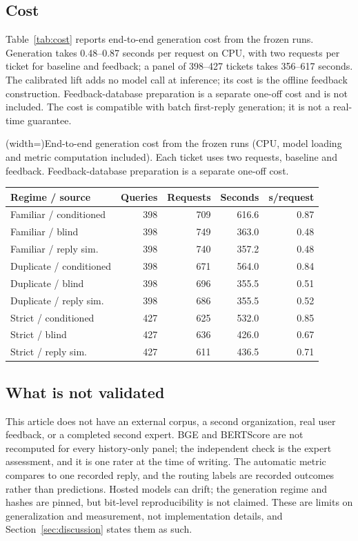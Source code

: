\subsection{Cost}
Table~\ref{tab:cost} reports end-to-end generation cost from the frozen runs.
Generation takes 0.48--0.87 seconds per request on CPU, with two requests per ticket
for baseline and feedback; a panel of 398--427 tickets takes 356--617 seconds. The
calibrated lift adds no model call at inference; its cost is the offline feedback
construction. Feedback-database preparation is a separate one-off cost and is not
included. The cost is compatible with batch first-reply generation; it is not a
real-time guarantee.

\Table[!btp](width=\textwidth){End-to-end generation cost from the frozen runs
(CPU, model loading and metric computation included). Each ticket uses two
requests, baseline and feedback. Feedback-database preparation is a separate
one-off cost.\label{tab:cost}}{
\begin{tabular}{@{}lrrrr@{}}
\toprule
Regime / source & Queries & Requests & Seconds & s/request \\
\midrule
Familiar / conditioned    & 398 & 709 & 616.6 & 0.87 \\
Familiar / blind          & 398 & 749 & 363.0 & 0.48 \\
Familiar / reply sim.     & 398 & 740 & 357.2 & 0.48 \\
Duplicate / conditioned   & 398 & 671 & 564.0 & 0.84 \\
Duplicate / blind         & 398 & 696 & 355.5 & 0.51 \\
Duplicate / reply sim.    & 398 & 686 & 355.5 & 0.52 \\
Strict / conditioned      & 427 & 625 & 532.0 & 0.85 \\
Strict / blind            & 427 & 636 & 426.0 & 0.67 \\
Strict / reply sim.       & 427 & 611 & 436.5 & 0.71 \\
\bottomrule
\end{tabular}}

\subsection{What is not validated}
This article does not have an external corpus, a second organization, real user
feedback, or a completed second expert. BGE and BERTScore are not recomputed for
every history-only panel; the independent check is the expert assessment, and it is one
rater at the time of writing. The automatic metric compares to one recorded reply,
and the routing labels are recorded outcomes rather than predictions. Hosted models
can drift; the generation regime and hashes are pinned, but bit-level
reproducibility is not claimed. These are limits on generalization and measurement,
not implementation details, and Section~\ref{sec:discussion} states them as such.
